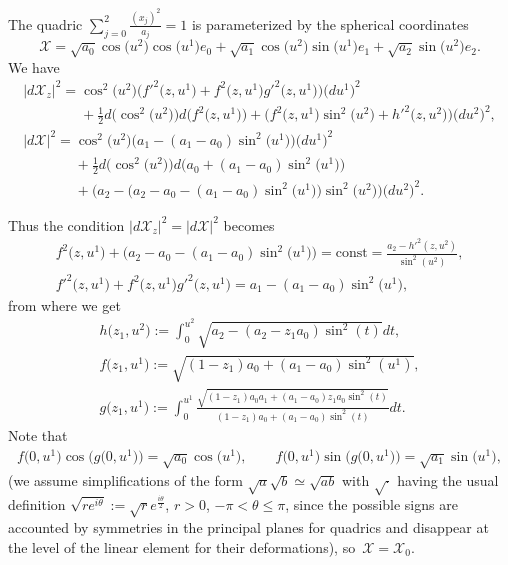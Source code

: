 \documentclass[11pt]{article}
\begin{document}
The quadric $\sum\limits_{j=0}^2\frac{(x_j)^2}{a_j}=1$ is parameterized
by the spherical coordinates
\[
\mathcal{X}=\sqrt{a_0}\cos\big(u^2\big)\cos\big(u^1\big)e_0
+\sqrt{a_1}\cos\big(u^2\big)\sin\big(u^1\big)e_1+\sqrt{a_2}\sin\big(u^2\big)e_2.
\]
We have
\begin{gather*}
|d\mathcal{X}_z|^2=\cos^2\big(u^2\big)\big(f'^2\big(z,u^1\big)
+f^2\big(z,u^1\big)g'^2\big(z,u^1\big)\big)\big(du^1\big)^2
\\
\phantom{|d\mathcal{X}_z|^2=}{}
+\tfrac{1}{2}d\big(\cos^2\big(u^2\big)\big)d\big(f^2\big(z,u^1\big)\big)
+\big(f^2\big(z,u^1\big)\sin^2\big(u^2\big)+h'^2\big(z,u^2\big)\big)\big(du^2\big)^2,
\\
|d\mathcal{X}|^2
=\cos^2\big(u^2\big)\big(a_1-(a_1-a_0)\sin^2\big(u^1\big)\big)\big(du^1\big)^2\\
\phantom{|d\mathcal{X}|^2=}{}
+\tfrac{1}{2}d\big(\cos^2\big(u^2\big)\big)
d\big(a_0+(a_1-a_0)\sin^2\big(u^1\big)\big)
\\
\phantom{|d\mathcal{X}|^2=}{}
+\big(a_2-\big(a_2-a_0-(a_1-a_0)\sin^2\big(u^1\big)\big)\sin^2\big(u^2\big)\big)\big(du^2\big)^2.
\end{gather*}

Thus the condition $|d\mathcal{X}_z|^2=|d\mathcal{X}|^2$ becomes
\begin{gather*}
f^2\big(z,u^1\big)+\big(a_2-a_0-(a_1-a_0)\sin^2\big(u^1\big)\big)=\mathrm{const}=
\frac{a_2-h'^2(z,u^2)}{\sin^2(u^2)},
\\
f'^2\big(z,u^1\big)+f^2\big(z,u^1\big)g'^2\big(z,u^1\big)=a_1-(a_1-a_0)\sin^2\big(u^1\big),
\end{gather*}
from where we get
\begin{gather}
h\big(z_1,u^2\big):=\int_0^{u^2}\sqrt{a_2-(a_2-z_1a_0)\sin^2(t)}dt,\nonumber\\
f\big(z_1,u^1\big):=\sqrt{(1-z_1)a_0+(a_1-a_0)\sin^2(u^1)},\nonumber\\
g\big(z_1,u^1\big):=\int_0^{u^1}\frac{\sqrt{(1-z_1)a_0a_1+(a_1-a_0)z_1a_0\sin^2(t)}}
{(1-z_1)a_0+(a_1-a_0)\sin^2(t)}dt.\label{eq:fg}
\end{gather}
Note that
\begin{gather}
f\big(0,u^1\big)\cos\big(g\big(0,u^1\big)\big)=\sqrt{a_0}\cos\big(u^1\big),\qquad
f\big(0,u^1\big)\sin\big(g\big(0,u^1\big)\big)=\sqrt{a_1}\sin\big(u^1\big),\label{eq:fg0}
\end{gather}
(we assume simplif\/ications of the form
$\sqrt{a}\sqrt{b}\simeq\sqrt{ab}$ with $\sqrt{\cdot}$ having the
usual def\/inition
$\sqrt{re^{i\theta}}:=\sqrt{r}e^{\frac{i\theta}{2}}$, $r>0$,
$-\pi<\theta\le\pi$, since the possible signs are accounted by
symmetries in the principal planes for quadrics and disappear at
the level of the linear element for their deformations), so~$\mathcal{X}=\mathcal{X}_0$.
\end{document}
